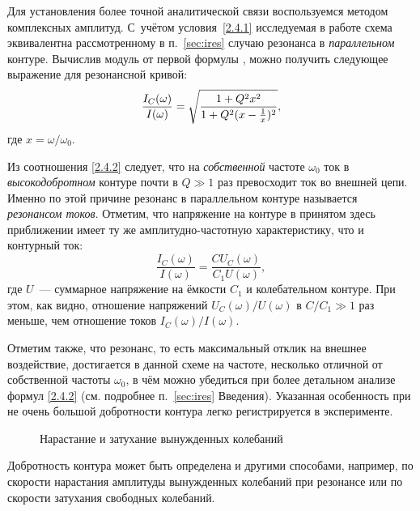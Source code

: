 Для установления более точной аналитической связи воспользуемся 
методом комплексных амплитуд. С~учётом условия~\eqref{2.4.1} 
исследуемая в работе схема эквивалентна рассмотренному в п.~\ref{sec:ires} 
случаю резонанса в \emph{параллельном} контуре. 
Вычислив модуль от первой формулы , можно получить 
следующее выражение
для резонансной кривой:
\begin{equation}
\eqmark{2.4.2}
\frac{I_C(\omega)}{I(\omega)} = 
\sqrt{\frac{1+Q^2x^2}{1+Q^2(x-\frac1x)^2}},
\end{equation}
где $x=\omega/\omega_0$.

Из соотношения \eqref{2.4.2} следует, 
что на \emph{собственной} частоте $\omega_0$ ток в \emph{высокодобротном} 
контуре почти в $Q\gg 1$ раз превосходит ток во внешней цепи. 
Именно по этой причине резонанс в параллельном контуре называется 
\emph{резонансом токов}. 
Отметим, что напряжение на контуре в принятом здесь приближении имеет ту 
же амплитудно-частотную характеристику, что и контурный ток:
\[
\frac{I_C(\omega)}{I(\omega)} = \frac{CU_C(\omega)}{C_1 U(\omega)},
\]
где $U$~--- суммарное напряжение на ёмкости $C_1$ и колебательном контуре.
При этом, как видно, отношение напряжений $U_C(\omega)/U(\omega)$ в $C/C_1\gg1$ 
раз меньше, чем отношение токов $I_C(\omega)/I(\omega)$.

Отметим также, что резонанс, то есть максимальный отклик на внешнее воздействие, 
достигается в данной схеме на частоте, несколько отличной от собственной частоты 
$\omega_0$, в чём можно убедиться при более детальном анализе формул \eqref{2.4.2}
(см. подробнее п.~\ref{sec:ires} Введения). 
Указанная особенность при не очень большой добротности контура легко регистрируется 
в эксперименте.



\begin{figure}
    \centering
    \caption{Нарастание и затухание вынужденных колебаний}
\end{figure}

Добротность контура может быть определена и другими способами, например, 
по скорости нарастания амплитуды вынужденных колебаний при резонансе 
или по скорости затухания свободных колебаний. 

